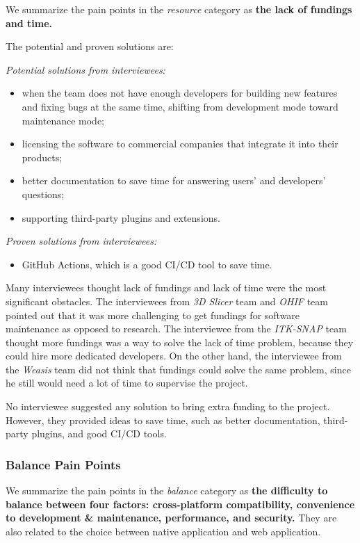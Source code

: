 \documentclass[3p, 12pt,authoryear]{elsarticle}
\begin{document}
We summarize the pain points in the \textit{resource} category as
\textbf{the lack of fundings and time.}

The potential and proven solutions are:

\noindent\textit{Potential solutions from interviewees:}
\begin{itemize}
\item when the team does not have enough developers for building new features
and fixing bugs at the same time, shifting from development mode toward
maintenance mode;
\item licensing the software to commercial companies that integrate it into
their products;
\item better documentation to save time for answering users' and developers'
questions;
\item supporting third-party plugins and extensions.
\end{itemize}

\noindent\textit{Proven solutions from interviewees:}

\begin{itemize}
\item GitHub Actions, which is a good CI/CD tool to save time.
\end{itemize}

Many interviewees thought lack of fundings and lack of time were the most
significant obstacles. The interviewees from \textit{3D Slicer} team and
\textit{OHIF} team pointed out that it was more challenging to get fundings for
software maintenance as opposed to research. The interviewee from the
\textit{ITK-SNAP} team thought more fundings was a way to solve the lack of time
problem, because they could hire more dedicated developers. On the other hand,
the interviewee from the \textit{Weasis} team did not think that fundings could
solve the same problem, since he still would need a lot of time to supervise the
project.

No interviewee suggested any solution to bring extra funding to the project.
However, they provided ideas to save time, such as better documentation,
third-party plugins, and good CI/CD tools.

\subsubsection{Balance Pain Points} \label{sec_pain_points_2}

We summarize the pain points in the \textit{balance} category as \textbf{the
difficulty to balance between four factors: cross-platform compatibility,
convenience to development \& maintenance, performance, and security.} They are
also related to the choice between native application and web application.
\end{document}
